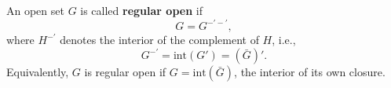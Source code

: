 An open set $G$ is called \textbf{regular open} if
$$G = G^{-'-'},$$
where $H^{-'}$ denotes the interior of the complement of $H$, i.e.,
$$G^{-'} = \text{int}(G') = (\bar{G})'.$$
Equivalently, $G$ is regular open if $G = \text{int}(\bar{G})$, the interior of its own closure.
